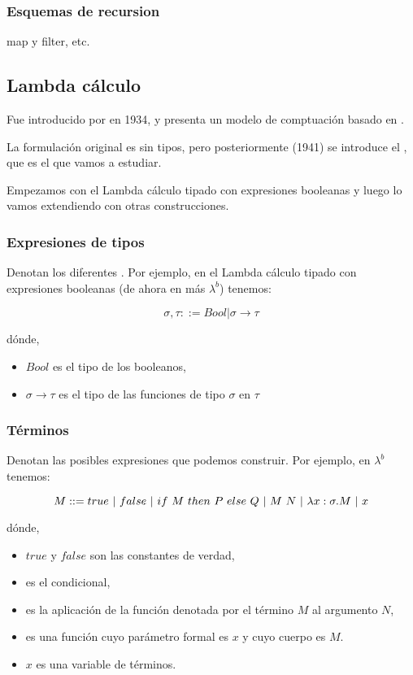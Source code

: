 \subsubsection{Esquemas de recursion}

map y filter, etc.

\subsection{Lambda cálculo}

Fue introducido por  en 1934, y presenta un modelo de comptuación basado en .

La formulación original es sin tipos, pero posteriormente (1941) se introduce el , que es el que vamos a estudiar.

Empezamos con el Lambda cálculo tipado con expresiones booleanas y luego lo vamos extendiendo con otras construcciones.

\subsubsection{Expresiones de tipos}

Denotan los diferentes . Por ejemplo, en el Lambda cálculo tipado con expresiones booleanas (de ahora en más $\lambda^b$) tenemos:

\[ \sigma, \tau ::= Bool|\sigma\to\tau \]

dónde,
\begin{itemize}
  \item $Bool$ es el tipo de los booleanos,
  \item $\sigma\to\tau$ es el tipo de las funciones de tipo $\sigma$ en $\tau$
\end{itemize}

\subsubsection{Términos}

Denotan las posibles expresiones que podemos construir. Por ejemplo, en $\lambda^b$ tenemos:

\[ M ::= true \ |\  false \ |\  if\ M\ then\ P\ else\ Q \ |\  M\ N \ |\  \lambda x:\sigma.M \ |\  x \]

dónde,
\begin{itemize}
  \item $true$ y $false$ son las constantes de verdad,
  \item {} es el condicional,
  \item {} es la aplicación de la función denotada por el término $M$ al argumento $N$,
  \item {} es una función cuyo parámetro formal es $x$ y cuyo cuerpo es $M$.
  \item $x$ es una variable de términos.
\end{itemize}

